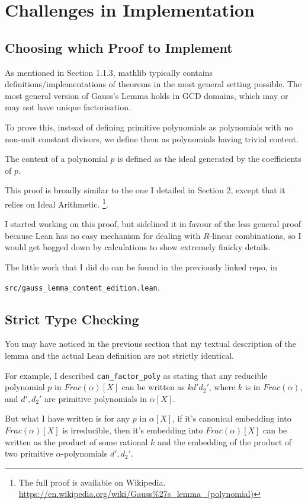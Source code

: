 \documentclass[pagesize=a4]{scrreprt}
\begin{document}
\chapter{Challenges in Implementation}

\section{Choosing which Proof to Implement}

As mentioned in Section 1.1.3, mathlib typically contains definitions/implementations of theorems in the most general setting possible. The most general version of Gauss's Lemma holds in GCD domains, which may or may not have unique factorisation. 

To prove this, instead of defining primitive polynomials as polynomials with no non-unit constant divisors, we define them as polynomials having trivial content. 

The content of a polynomial $p$ is defined as the ideal generated by the coefficients of $p$. 

This proof is broadly similar to the one I detailed in Section 2, except that it relies on Ideal Arithmetic. \footnote{The full proof is available on Wikipedia. \url{https://en.wikipedia.org/wiki/Gauss\%27s\_lemma\_(polynomial)}}. 

I started working on this proof, but sidelined it in favour of the less general proof because Lean has no easy mechanism for dealing with $R$-linear combinations, so I would get bogged down by calculations to show extremely finicky details. 

The little work that I did do can be found in the previously linked repo, in 

\texttt{src/gauss\_lemma\_content\_edition.lean}. 


\section{Strict Type Checking}

You may have noticed in the previous section that my textual description of the lemma and the actual Lean definition are not strictly identical. 

For example, I described \texttt{can\_factor\_poly} as stating that any reducible polynomial $p$ in $Frac(\alpha)[X]$ can be written as $kd'd_2'$, where $k$ is in $Frac(\alpha)$, and $d', d_2'$ are primitive polynomials in $ \alpha[X]$. 

But what I have written is for any $p$ in $\alpha[X]$, if it's canonical embedding into $Frac(\alpha)[X]$ is irreducible, then it's embedding into $Frac(\alpha)[X]$ can be written as the product of some rational $k$ and the embedding of the product of two primitive $\alpha$-polynomials $d',d_2'$. 
\end{document}
